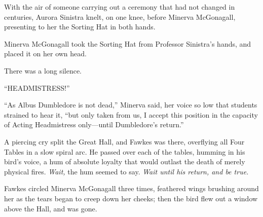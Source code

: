 With the air of someone carrying out a ceremony that had not changed in
centuries, Aurora Sinistra knelt, on one knee, before Minerva McGonagall,
presenting to her the Sorting Hat in both hands.

Minerva McGonagall took the Sorting Hat from Professor Sinistra’s hands, and
placed it on her own head.

There was a long silence.

“HEADMISTRESS!”

“As Albus Dumbledore is not dead,” Minerva said, her voice so low that students
strained to hear it, “but only taken from us, I accept this position in the
capacity of Acting Headmistress only—until Dumbledore’s return.”

A piercing cry split the Great Hall, and Fawkes was there, overflying all Four
Tables in a slow spiral arc. He passed over each of the tables, humming in his
bird’s voice, a hum of absolute loyalty that would outlast the death of merely
physical fires. \emph{Wait,} the hum seemed to say. \emph{Wait until his
return, and be true.}

Fawkes circled Minerva McGonagall three times, feathered wings brushing around
her as the tears began to creep down her cheeks; then the bird flew out a
window above the Hall, and was gone.
